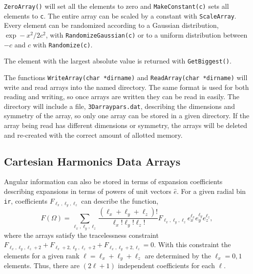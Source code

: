 \documentclass[10pt]{article}
\begin{document}
{\tt ZeroArray()} will set all the elements to zero and {\tt MakeConstant(c)} sets all elements to {\tt c}. The entire array can be scaled by a constant with {\tt ScaleArray}. Every element can be randomized according to a Gaussian distribution, $\exp -x^2/2c^2$, with {\tt RandomizeGaussian(c)} or to a uniform distribution between $-c$ and $c$ with {\tt Randomize(c)}.

The element with the largest absolute value is returned with {\tt GetBiggest()}.

The functions {\tt WriteArray(char *dirname)} and {\tt ReadArray(char *dirname)} will write and read arrays into the named directory. The same format is used for both reading and writing, so once arrays are written they can be read in easily. The directory will include a file, {\tt 3Darraypars.dat}, describing the dimensions and symmetry of the array, so only one array can be stored in a given directory. If the array being read has different dimensions or symmetry, the arrays will be deleted and re-created with the correct amount of allotted memory. 


\subsection{Cartesian Harmonics Data Arrays}

Angular information can also be stored in terms of expansion coefficients describing expansions in terms of powers of unit vectors $\hat{e}$. For a given radial bin {\tt ir}, coefficients $F_{\ell_x,\ell_y,\ell_z}$ can describe the function,
\begin{equation}
\label{eq:aexpansion}
F(\Omega)=\sum_{\ell_x,\ell_y,\ell_z} \frac{(\ell_x+\ell_y+\ell_z)!}
{\ell_x!\ell_y!\ell_z!} F_{\ell_x,\ell_y,\ell_z}
e_x^{\ell_x}e_y^{\ell_y}e_z^{\ell_z},
\end{equation}
where the arrays satisfy the tracelessness constraint $F_{\ell_x,\ell_y,\ell_z+2}+F_{\ell_x+2,\ell_y,\ell_z+2}+F_{\ell_x,\ell_y+2,\ell_z}=0$. With this constraint the elements for a given rank $\ell=\ell_x+\ell_y+\ell_z$ are determined by the $\ell_x=0,1$ elements. Thus, there are $(2\ell+1)$ independent coefficients for each $\ell$.
\end{document}

